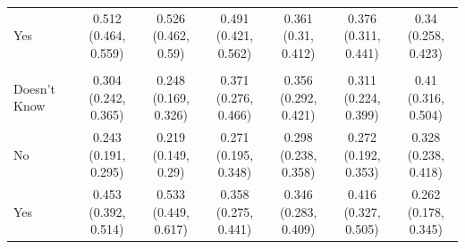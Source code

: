 \begin{tabular}[t]{lcccccc}
\hspace{1em}Yes & \makecell[c]{0.512\\(0.464, 0.559)} & \makecell[c]{0.526\\(0.462, 0.59)} & \makecell[c]{0.491\\(0.421, 0.562)} & \makecell[c]{0.361\\(0.31, 0.412)} & \makecell[c]{0.376\\(0.311, 0.441)} & \makecell[c]{0.34\\(0.258, 0.423)}\\
\addlinespace[0.3em]
\hline
\multicolumn{7}{l}{\textbf{Control}}\\
\hline
\hspace{1em}Doesn't Know & \makecell[c]{0.304\\(0.242, 0.365)} & \makecell[c]{0.248\\(0.169, 0.326)} & \makecell[c]{0.371\\(0.276, 0.466)} & \makecell[c]{0.356\\(0.292, 0.421)} & \makecell[c]{0.311\\(0.224, 0.399)} & \makecell[c]{0.41\\(0.316, 0.504)}\\
\hspace{1em}No & \makecell[c]{0.243\\(0.191, 0.295)} & \makecell[c]{0.219\\(0.149, 0.29)} & \makecell[c]{0.271\\(0.195, 0.348)} & \makecell[c]{0.298\\(0.238, 0.358)} & \makecell[c]{0.272\\(0.192, 0.353)} & \makecell[c]{0.328\\(0.238, 0.418)}\\
\hspace{1em}Yes & \makecell[c]{0.453\\(0.392, 0.514)} & \makecell[c]{0.533\\(0.449, 0.617)} & \makecell[c]{0.358\\(0.275, 0.441)} & \makecell[c]{0.346\\(0.283, 0.409)} & \makecell[c]{0.416\\(0.327, 0.505)} & \makecell[c]{0.262\\(0.178, 0.345)}\\
\bottomrule
\end{tabular}

